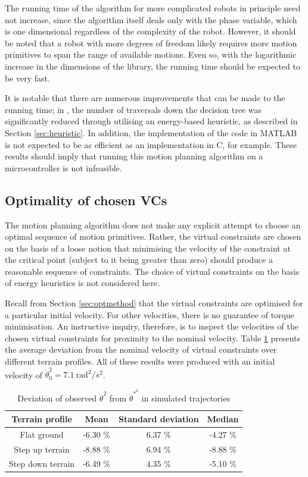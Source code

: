The running time of the algorithm for more complicated robots in principle need not increase, since the algorithm itself deals only with the phase variable, which is one dimensional regardless of the complexity of the robot. However, it should be noted that a robot with more degrees of freedom likely requires more motion primitives to span the range of available motions. Even so, with the logarithmic increase in the dimensions of the library, the running time should be expected to be very fast.

It is notable that there are numerous improvements that can be made to the running time; in \cite{manchester13planning}, the number of traversals down the decision tree was significantly reduced through utilising an energy-based heuristic, as described in Section \ref{sec:heuristic}. In addition, the implementation of the code in MATLAB is not expected to be as efficient as an implementation in C, for example. These results should imply that running this motion planning algorithm on a microcontroller is not infeasible.

\subsection{Optimality of chosen VCs} \label{sec:resnom}
The motion planning algorithm does not make any explicit attempt to choose an optimal sequence of motion primitives. Rather, the virtual constraints are chosen on the basis of a loose notion that minimising the velocity of the constraint at the critical point (subject to it being greater than zero) should produce a reasonable sequence of constraints. The choice of virtual constraints on the basis of energy heuristics is not considered here.

Recall from Section \ref{sec:optmethod} that the virtual constraints are optimised for a particular initial velocity. For other velocities, there is no guarantee of torque minimisation. An instructive inquiry, therefore, is to inspect the velocities of the chosen virtual constraints for proximity to the nominal velocity. Table \ref{tab:nomvel} presents the average deviation from the nominal velocity of virtual constraints over different terrain profiles. All of these results were produced with an initial velocity of $\dot{\theta}_0^2=7.1~\mathrm{rad}^2/s^2$.

\begin{table}
	\centering
	\begin{tabular}{c | c | c | c }
		Terrain profile & Mean & Standard deviation & Median \\ \hline
		Flat ground & -6.30 \% & 6.37 \% & -4.27 \% \\
		Step up terrain & -8.88 \% & 6.94 \% & -8.88 \% \\
		Step down terrain & -6.49 \% & 4.35 \% & -5.10 \%\\
	\end{tabular}
	\caption{Deviation of observed $\dot{\theta}^2$ from $\dot{\theta}^{*^2}$ in simulated trajectories}
	\label{tab:nomvel}
\end{table}

